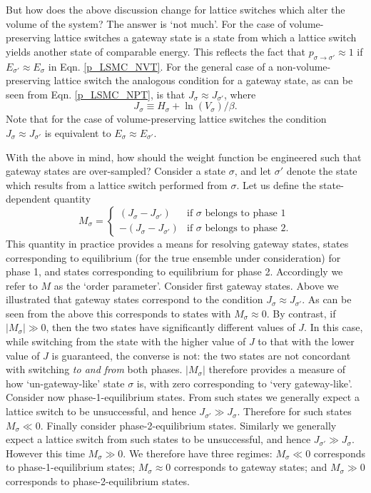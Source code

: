 \documentclass{report}
\begin{document}
But how does the above discussion change for lattice switches which alter the volume of the system? The answer is `not much'. For the
case of volume-preserving lattice switches a gateway state is a state from which a lattice switch yields another state of comparable energy.
This reflects the fact that $p_{\sigma\to\sigma'}\approx 1$ if $E_{\sigma'}\approx E_{\sigma}$ in Eqn. \eqref{p_LSMC_NVT}. For the general case of a
non-volume-preserving lattice switch the analogous condition for a gateway state, as can be seen from Eqn. \eqref{p_LSMC_NPT}, is that
$J_{\sigma}\approx J_{\sigma'}$, where
\begin{equation}
J_{\sigma}\equiv H_{\sigma}+\ln(V_{\sigma})/\beta.
\end{equation}
Note that for the case of volume-preserving lattice switches the condition $J_{\sigma}\approx J_{\sigma'}$ is equivalent to $E_{\sigma}\approx E_{\sigma'}$.

With the above in mind, how should the weight function be engineered such that gateway states are over-sampled? 
Consider a state $\sigma$, and let $\sigma'$ denote the state which results from a lattice switch performed from $\sigma$. Let us define the 
state-dependent quantity
\begin{equation}\label{M_def}
M_{\sigma}=
\begin{cases}
(J_{\sigma}-J_{\sigma'}) & \text{if $\sigma$ belongs to phase 1} \\
-(J_{\sigma}-J_{\sigma'}) & \text{if $\sigma$ belongs to phase 2}.
\end{cases}
\end{equation}
This quantity in practice provides a means for resolving gateway states, states corresponding to equilibrium (for the true ensemble under consideration)
for phase 1, and states corresponding to equilibrium for phase 2. Accordingly we refer to $M$ as the `order parameter'. Consider first gateway states.
Above we illustrated that gateway states correspond to the condition $J_{\sigma}\approx J_{\sigma'}$. As can be seen from the above this corresponds to
states with $M_{\sigma}\approx 0$. By contrast, if $|M_{\sigma}|\gg 0$, then the two states have significantly different values of $J$. In this case, while
switching from the state with the higher value of $J$ to that with the lower value of $J$ is guaranteed, the converse is not: the two states are not 
concordant with switching \emph{to and from} both phases. $|M_{\sigma}|$ therefore provides a measure of how `un-gateway-like' state $\sigma$ is, with 
zero corresponding to `very gateway-like'. 
Consider now phase-1-equilibrium states. From such states we generally expect a lattice switch to be unsuccessful, and hence
$J_{\sigma'}\gg J_{\sigma}$. Therefore for such states $M_{\sigma}\ll 0$. Finally consider phase-2-equilibrium states. Similarly we generally expect 
a lattice switch from such states to be unsuccessful, and hence $J_{\sigma'}\gg J_{\sigma}$. However this time $M_{\sigma}\gg 0$. We therefore have three regimes:
$M_{\sigma}\ll 0$ corresponds to phase-1-equilibrium states; $M_{\sigma}\approx 0$ corresponds to gateway states; and $M_{\sigma}\gg 0$ corresponds to 
phase-2-equilibrium states.
\end{document}
